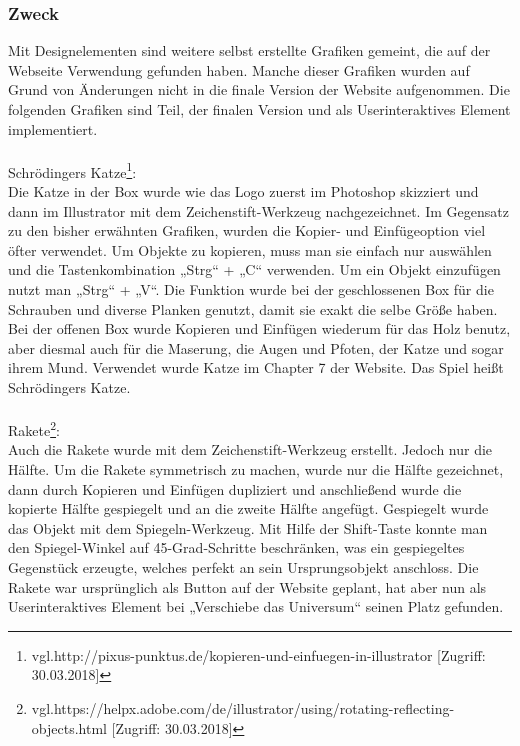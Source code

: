 \subsubsection{Zweck}
Mit Designelementen sind weitere selbst erstellte Grafiken gemeint, die auf der Webseite Verwendung gefunden haben. Manche dieser Grafiken wurden auf Grund von Änderungen nicht in die finale Version der Website aufgenommen. Die folgenden Grafiken sind Teil, der finalen Version und als Userinteraktives Element implementiert.
\leavevmode \\
\leavevmode \\
Schrödingers Katze\footnote{\label{} vgl.http://pixus-punktus.de/kopieren-und-einfuegen-in-illustrator [Zugriff: 30.03.2018]}:
\leavevmode \\
Die Katze in der Box wurde wie das Logo zuerst im Photoshop skizziert und dann im Illustrator mit dem Zeichenstift-Werkzeug nachgezeichnet. Im Gegensatz zu den bisher erwähnten Grafiken, wurden die Kopier- und Einfügeoption viel öfter verwendet. Um Objekte zu kopieren, muss man sie einfach nur auswählen und die Tastenkombination „Strg“ + „C“ verwenden. Um ein Objekt einzufügen nutzt man „Strg“ + „V“. Die Funktion wurde bei der geschlossenen Box für die Schrauben und diverse Planken genutzt, damit sie exakt die selbe Größe haben. Bei der offenen Box wurde Kopieren und Einfügen wiederum für das Holz benutz, aber diesmal auch für die Maserung, die Augen und Pfoten, der Katze und sogar ihrem Mund. Verwendet wurde Katze im Chapter 7 der Website. Das Spiel heißt Schrödingers Katze.
\leavevmode \\
\leavevmode \\
Rakete\footnote{\label{} vgl.https://helpx.adobe.com/de/illustrator/using/rotating-reflecting-objects.html [Zugriff: 30.03.2018]}: 
\leavevmode \\
Auch die Rakete wurde mit dem Zeichenstift-Werkzeug erstellt. Jedoch nur die Hälfte. Um die Rakete symmetrisch zu machen, wurde nur die Hälfte gezeichnet, dann durch Kopieren und Einfügen dupliziert und anschließend wurde die kopierte Hälfte gespiegelt und an die zweite Hälfte angefügt. Gespiegelt wurde das Objekt mit dem Spiegeln-Werkzeug. Mit Hilfe der Shift-Taste konnte man den Spiegel-Winkel auf 45-Grad-Schritte beschränken, was ein gespiegeltes Gegenstück erzeugte, welches perfekt an sein Ursprungsobjekt anschloss. Die Rakete war ursprünglich als Button auf der Website geplant, hat aber nun als Userinteraktives Element bei „Verschiebe das Universum“ seinen Platz gefunden.
